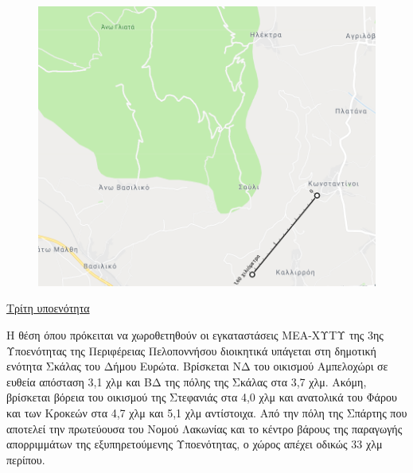 \documentclass[12pt]{article}
\begin{document}
	\begin{figure} [H]
		\begin{center}
			\includegraphics [scale = 0.40] {map4.png}
		\end{center}
	\end{figure}

	\underline{Τρίτη υποενότητα}
	
	Η θέση όπου πρόκειται να χωροθετηθούν οι εγκαταστάσεις ΜΕΑ-ΧΥΤΥ της 3ης  Υποενότητας της Περιφέρειας Πελοποννήσου διοικητικά υπάγεται στη δημοτική ενότητα Σκάλας του Δήμου Ευρώτα. Βρίσκεται ΝΔ του οικισμού Αμπελοχώρι σε ευθεία απόσταση 3,1 χλμ και ΒΔ της πόλης της Σκάλας στα 3,7 χλμ. Ακόμη, βρίσκεται βόρεια του οικισμού της Στεφανιάς στα 4,0 χλμ και ανατολικά του Φάρου και των Κροκεών στα 4,7 χλμ και 5,1 χλμ αντίστοιχα. Από την πόλη της Σπάρτης που αποτελεί την πρωτεύουσα του Νομού Λακωνίας και το κέντρο βάρους της παραγωγής απορριμμάτων της εξυπηρετούμενης Υποενότητας, ο χώρος απέχει οδικώς 33 χλμ περίπου.
	
\end{document}
